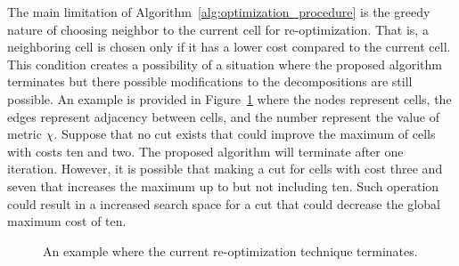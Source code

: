 \documentclass[../main.tex]{subfiles}
\begin{document}
The main limitation of Algorithm~\ref{alg:optimization_procedure} is the greedy nature of choosing neighbor to the current cell for re-optimization. That is, a neighboring cell is chosen only if it has a lower cost compared to the current cell. This condition creates a possibility of a situation where the proposed algorithm terminates but there possible modifications to the decompositions are still possible. An example is provided in Figure~\ref{figure:algo_stuck} where the nodes represent cells, the edges represent adjacency between cells, and the number represent the value of metric $\chi$. Suppose that no cut exists that could improve the maximum of cells with costs ten and two. The proposed algorithm will terminate after one iteration. However, it is possible that making a cut for cells with cost three and seven that increases the maximum up to but not including ten. Such operation could result in a increased search space for a cut that could decrease the global maximum cost of ten.


\begin{figure}
	\centering
	\caption{An example where the current re-optimization technique terminates.}
	\label{figure:algo_stuck}
\end{figure}

\end{document}
